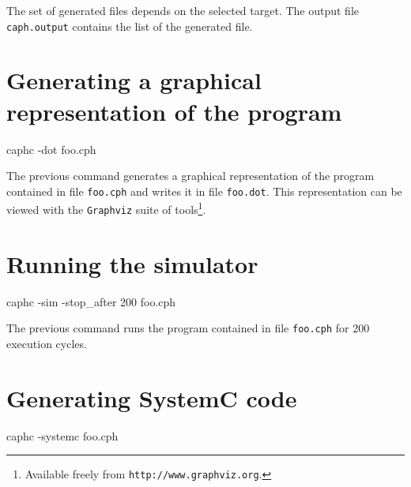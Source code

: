 The set of generated files depends on the selected target. The output file \texttt{caph.output}
contains the list of the generated file.

\section{Generating a graphical representation of the program}
\label{sec:gener-graph-repr}


\begin{example}
caphc -dot foo.cph  
\end{example}

The previous command generates a graphical representation of the program contained in file
\texttt{foo.cph} and writes it in file \texttt{foo.dot}.  This representation can be viewed with the
\texttt{Graphviz} suite of tools\footnote{Available freely from \texttt{http://www.graphviz.org}.}.

\section{Running the simulator}
\label{sec:running-simulator}

\begin{example}
caphc -sim -stop_after 200 foo.cph  
\end{example}

The previous command runs the program contained in file \texttt{foo.cph} for 200 execution cycles.

\section{Generating SystemC code}
\label{sec:gener-syst-code}

\begin{example}
caphc -systemc foo.cph  
\end{example}

